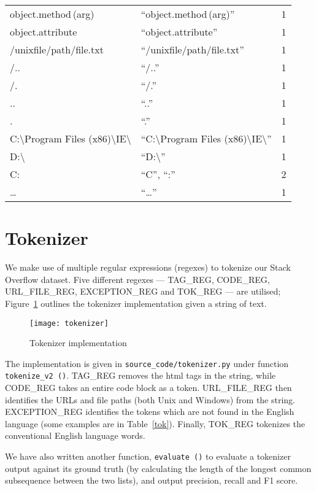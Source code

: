 \begin{table}
\begin{tabu}{X[5,l]X[5,l]X[2,l]}
    object.method\,(arg) & ``object.method\,(arg)'' & 1 \\
    object.attribute & ``object.attribute'' & 1 \\
    /unixfile/path/file.txt & ``/unixfile/path/file.txt'' & 1 \\
    /.. & ``/..'' & 1 \\
    /. & ``/.'' & 1 \\
    .. & ``..'' & 1 \\
    . & ``.'' & 1 \\
    C:\textbackslash{}Program Files (x86)\textbackslash{}IE\textbackslash{}
    & ``C:\textbackslash{}Program Files (x86)\textbackslash{}IE\textbackslash{}''
    & 1 \\
    D:\textbackslash{} & ``D:\textbackslash{}'' & 1 \\
    C\@: & ``C'', ``:'' & 2 \\
    \ldots & ``\ldots'' & 1 \\
\end{tabu}
\end{table}
\twocolumn

\section{Tokenizer}

We make use of multiple regular expressions (regexes) to tokenize our Stack
Overflow dataset. Five different regexes --- TAG\_REG, CODE\_REG, URL\_FILE\_REG,
EXCEPTION\_REG and TOK\_REG --- are utilised; Figure~\ref{img:tok} outlines the
tokenizer implementation given a string of text.

\begin{figure}[htp]
\texttt{[image: tokenizer]}
\caption{Tokenizer implementation}\label{img:tok}
\end{figure}

The implementation is given in \texttt{source\_code/tokenizer.py} under function
\texttt{tokenize\_v2\,()}.
TAG\_REG removes the html tags in the string, while CODE\_REG takes an entire code
block as a token. URL\_FILE\_REG then identifies the URLs and file paths (both Unix
and Windows) from the string. EXCEPTION\_REG identifies the tokens which are not
found in the English language (some examples are in Table~\ref{tok}). Finally,
TOK\_REG tokenizes the conventional English language words.

We have also written another function, \texttt{evaluate\,()} to evaluate a
tokenizer output against its ground truth (by calculating the length of the
longest common subsequence between the two lists), and output precision, recall
and F1 score.

